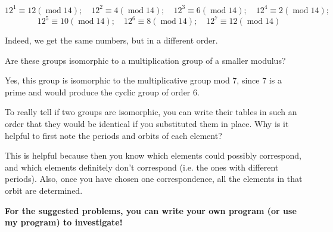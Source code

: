 \documentclass[../key.tex]{subfiles}
\begin{document}
$$12^1 \equiv 12 (\operatorname{mod} 14);\quad 12^2 \equiv 4 (\operatorname{mod} 14);\quad 12^3 \equiv 6 (\operatorname{mod} 14);\quad 12^4 \equiv 2 (\operatorname{mod} 14);$$
$$\quad 12^5 \equiv 10 (\operatorname{mod} 14);\quad 12^6 \equiv 8 (\operatorname{mod} 14);\quad 12^7 \equiv 12 (\operatorname{mod} 14)$$

Indeed, we get the same numbers, but in a different order.

\begin{inner_problem}
\item Are these groups isomorphic to a multiplication group of a smaller modulus?
\end{inner_problem}

Yes, this group is isomorphic to the multiplicative group mod $7$, since $7$ is a prime and would produce the cyclic group of order $6$.

\begin{outer_problem}
\item To really tell if two groups are isomorphic, you can write their tables in such an order that they would be identical if you substituted them in place. Why is it helpful to first note the periods and orbits of each element?
\end{outer_problem}

This is helpful because then you know which elements could possibly correspond, and which elements definitely don't correspond (i.e. the ones with different periods). Also, once you have chosen one correspondence, all the elements in that orbit are determined.

\textbf{For the suggested problems, you can write your own program (or use my program) to investigate!}
\end{document}
